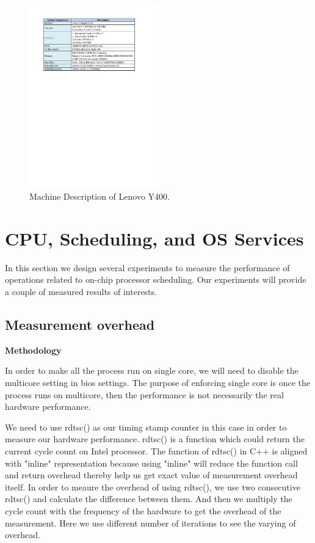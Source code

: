 \begin{figure}[!htp]
\centering
\includegraphics[width=0.5\textwidth]{figs/Machine_Description.pdf}
 \caption{Machine Description of Lenovo Y400.}
\end{figure}


\section{CPU, Scheduling, and OS Services }
\label{sec:cpu}
In this section we design several experiments to measure the performance of operations related to on-chip processor scheduling. Our experiments will provide a couple of measured results of interests.
\subsection{Measurement overhead}
\noindent\textbf{Methodology}

In order to make all the process run on single core, we will need to disable the multicore setting in bios settings. The purpose of enforcing single core is once the process runs on multicore, then the performance is not necessarily the real hardware performance.

We need to use rdtsc() as our timing stamp counter in this case in order to measure our hardware performance. rdtsc() is a function which could return the current cycle count on Intel processor. The function of rdtsc() in C++ is aligned with "inline" representation because using "inline" will reduce the function call and return overhead thereby help us get exact value of measurement overhead itself. In order to meaure the overhead of using rdtsc(), we use two consecutive rdtsc() and calculate the difference between them. And then we multiply the cycle count with the frequency of the hardware to get the overhead of the measurement. Here we use different number of iterations to see the varying of overhead.


